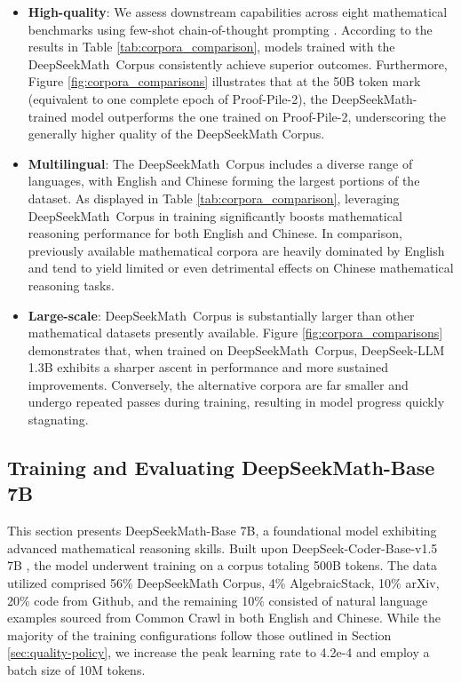 \begin{itemize}[topsep=0pt]
\begin{itemize}[topsep=0pt]
    \item \textbf{High-quality}: We assess downstream capabilities across eight mathematical benchmarks using few-shot chain-of-thought prompting \cite{cot}. According to the results in Table \ref{tab:corpora_comparison}, models trained with the DeepSeekMath~Corpus consistently achieve superior outcomes. Furthermore, Figure \ref{fig:corpora_comparisons} illustrates that at the 50B token mark (equivalent to one complete epoch of Proof-Pile-2), the DeepSeekMath-trained model outperforms the one trained on Proof-Pile-2, underscoring the generally higher quality of the DeepSeekMath Corpus.
    \item \textbf{Multilingual}: The DeepSeekMath~Corpus includes a diverse range of languages, with English and Chinese forming the largest portions of the dataset. As displayed in Table \ref{tab:corpora_comparison}, leveraging DeepSeekMath~Corpus in training significantly boosts mathematical reasoning performance for both English and Chinese. In comparison, previously available mathematical corpora are heavily dominated by English and tend to yield limited or even detrimental effects on Chinese mathematical reasoning tasks.
    \item \textbf{Large-scale}: DeepSeekMath~Corpus is substantially larger than other mathematical datasets presently available. Figure \ref{fig:corpora_comparisons} demonstrates that, when trained on DeepSeekMath~Corpus, DeepSeek-LLM 1.3B exhibits a sharper ascent in performance and more sustained improvements. Conversely, the alternative corpora are far smaller and undergo repeated passes during training, resulting in model progress quickly stagnating.
\end{itemize}

\subsection{Training and Evaluating DeepSeekMath-Base 7B}

This section presents DeepSeekMath-Base 7B, a foundational model exhibiting advanced mathematical reasoning skills. Built upon DeepSeek-Coder-Base-v1.5 7B \citep{deepseek-coder}, the model underwent training on a corpus totaling 500B tokens. The data utilized comprised 56\% DeepSeekMath Corpus, 4\% AlgebraicStack, 10\% arXiv, 20\% code from Github, and the remaining 10\% consisted of natural language examples sourced from Common Crawl in both English and Chinese. While the majority of the training configurations follow those outlined in Section \ref{sec:quality-policy}, we increase the peak learning rate to 4.2e-4 and employ a batch size of 10M tokens.


\end{itemize}
